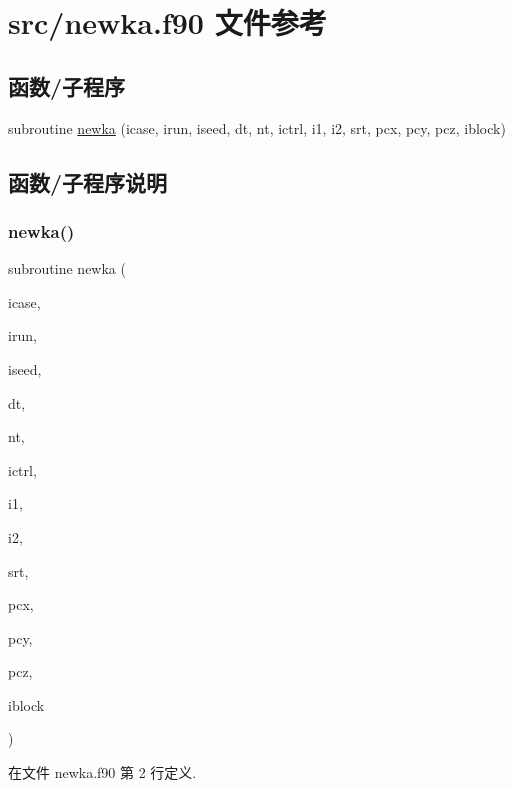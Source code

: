 \hypertarget{newka_8f90}{}\section{src/newka.f90 文件参考}
\label{newka_8f90}
\subsection*{函数/子程序}
\begin{DoxyCompactItemize}
\item 
subroutine \mbox{\hyperlink{newka_8f90_ab2b221cb7c41f91db530b21500d0976d}{newka}} (icase, irun, iseed, dt, nt, ictrl, i1, i2, srt, pcx, pcy, pcz, iblock)
\end{DoxyCompactItemize}


\subsection{函数/子程序说明}
\mbox{\label{newka_8f90_ab2b221cb7c41f91db530b21500d0976d}} 
\subsubsection{\texorpdfstring{newka()}{newka()}}
{\footnotesize\ttfamily subroutine newka (\begin{DoxyParamCaption}\item[{}]{icase,  }\item[{}]{irun,  }\item[{}]{iseed,  }\item[{}]{dt,  }\item[{}]{nt,  }\item[{}]{ictrl,  }\item[{}]{i1,  }\item[{}]{i2,  }\item[{}]{srt,  }\item[{}]{pcx,  }\item[{}]{pcy,  }\item[{}]{pcz,  }\item[{}]{iblock }\end{DoxyParamCaption})}



在文件 newka.\+f90 第 2 行定义.

